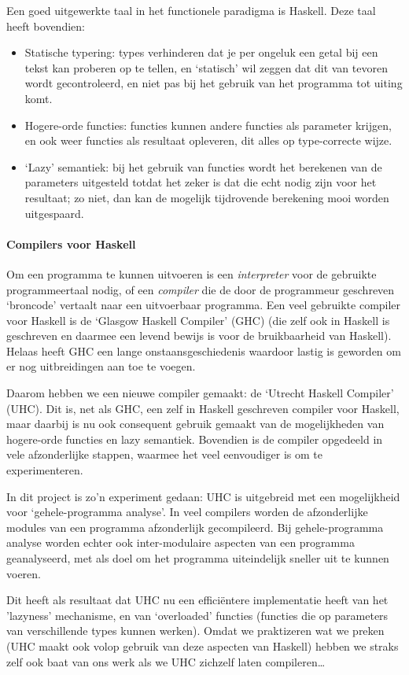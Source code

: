 \documentclass{article}
\begin{document}
Een goed uitgewerkte taal in het functionele paradigma is Haskell.
Deze taal heeft bovendien:
\begin{itemize}
\item Statische typering: types verhinderen dat je per ongeluk een getal bij een tekst 
kan proberen op te tellen, en `statisch' wil zeggen dat dit van tevoren wordt gecontroleerd,
en niet pas bij het gebruik van het programma tot uiting komt.
\item Hogere-orde functies: functies kunnen andere functies als parameter krijgen,
en ook weer functies als resultaat opleveren, dit alles op type-correcte wijze.
\item `Lazy' semantiek: bij het gebruik van functies wordt het berekenen van de parameters
uitgesteld totdat het zeker is dat die echt nodig zijn voor het resultaat;
zo niet, dan kan de mogelijk tijdrovende berekening mooi worden uitgespaard.
\end{itemize}


\paragraph{Compilers voor Haskell}

Om een programma te kunnen uitvoeren is een {\em interpreter} voor de gebruikte
programmeertaal nodig, of een {\em compiler} die de door de programmeur geschreven
`broncode' vertaalt naar een uitvoerbaar programma.
Een veel gebruikte compiler voor Haskell is de `Glasgow Haskell Compiler' (GHC)
(die zelf ook in Haskell is geschreven en daarmee een levend bewijs is voor de bruikbaarheid van Haskell).
Helaas heeft GHC een lange onstaansgeschiedenis waardoor lastig is geworden
om er nog uitbreidingen aan toe te voegen.

Daarom hebben we een nieuwe compiler gemaakt: de `Utrecht Haskell Compiler' (UHC).
Dit is, net als GHC, een zelf in Haskell geschreven compiler voor Haskell,
maar daarbij is nu ook consequent gebruik gemaakt van de mogelijkheden van hogere-orde functies
en lazy semantiek. Bovendien is de compiler opgedeeld in vele afzonderlijke stappen,
waarmee het veel eenvoudiger is om te experimenteren.

In dit project is zo'n experiment gedaan: UHC is uitgebreid met 
een mogelijkheid voor `gehele-programma analyse'.
In veel compilers worden de afzonderlijke modules van een programma afzonderlijk gecompileerd.
Bij gehele-programma analyse worden echter ook inter-modulaire aspecten 
van een programma geanalyseerd, met als doel om het programma uiteindelijk sneller uit te kunnen voeren.

Dit heeft als resultaat dat UHC nu een effici\"entere implementatie heeft van het
'lazyness' mechanisme, en van `overloaded' functies (functies die op parameters van verschillende
types kunnen werken).
Omdat we praktizeren wat we preken (UHC maakt ook volop gebruik van deze aspecten van Haskell)
hebben we straks zelf ook baat van ons werk als we UHC zichzelf laten compileren\dots
\end{document}
